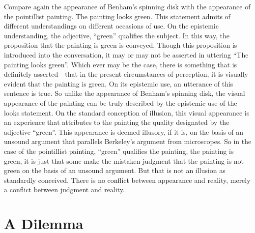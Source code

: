\documentclass[12pt]{article}
\begin{document}
Compare again the appearance of Benham's spinning disk with the appearance of the pointillist painting. The painting looks green. This statement admits of different understandings on different occasions of use. On the epistemic understanding, the adjective, ``green'' qualifies the subject. In this way, the proposition that the painting is green is conveyed. Though this proposition is introduced into the conversation, it may or may not be asserted in uttering ``The painting looks green''. Which ever may be the case, there is something that is definitely asserted---that in the present circumstances of perception, it is visually evident that the painting is green. On its epistemic use, an utterance of this sentence is true. So unlike the appearance of Benham's spinning disk, the visual appearance of the painting can be truly described by the epistemic use of the looks statement. On the standard conception of illusion, this visual appearance is an experience that attributes to the painting the quality designated by the adjective ``green''. This appearance is deemed illusory, if it is, on the basis of an unsound argument that parallels Berkeley's argument from microscopes. So in the case of the pointillist painting, ``green'' qualifies the painting, the painting is green, it is just that some make the mistaken judgment that the painting is not green on the basis of an unsound argument. But that is not an illusion as standardly conceived. There is no conflict between appearance and reality, merely a conflict between judgment and reality.


% 


\section{A Dilemma}\label{sec:a_dilemma} %
\end{document}
